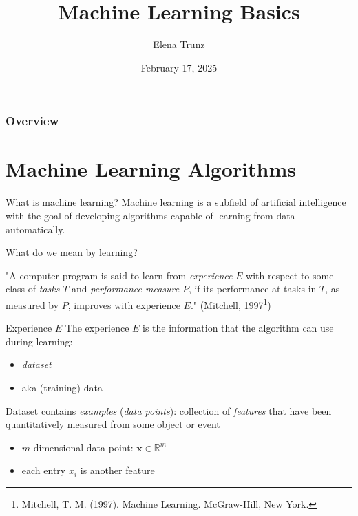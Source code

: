 \documentclass[dvipsnames]{beamer}
\title{Machine Learning Basics}
\date{February 17, 2025}%
\institute{Visual Computing Group, University of Bonn}
\author{Elena Trunz}
\begin{document}
    \maketitle

    \begin{frame}
    \frametitle{Overview} 
    \tableofcontents
    \end{frame}

   	\let\oldfootnoterule\footnoterule
	\def\footnoterule{\only<3->\oldfootnoterule}
    \section{Machine Learning Algorithms}
    \begin{frame}{What is machine learning?}
			Machine learning is a subfield of artificial intelligence with the goal of developing algorithms capable of learning
from data automatically. %

			What do we mean by learning? %

			"A computer program is said to learn from \emph{experience} $E$ with respect to some
class of \emph{tasks} $T$ and \emph{performance measure} $P$, if its performance at tasks in $T$, as
measured by $P$, improves with experience $E$." (Mitchell, 1997\footnote<3->{ Mitchell, T. M. (1997). Machine Learning. McGraw-Hill, New York.})

    \end{frame}
		
		\begin{frame}{Experience $E$}
		The experience $E$ is the information that the algorithm can use during learning:
		\begin{itemize}
			\item \emph{dataset} 
			\item aka (training) data
		\end{itemize} %

		Dataset contains \emph{examples} (\emph{data points}): collection of \emph{features} that have been quantitatively measured from some object or event
		\begin{itemize}
			\item $m$-dimensional data point: $\mathbf{x} \in \mathbb{R}^m$
			\item each entry $x_i$ is another feature
		\end{itemize}
    \end{frame}
		
\end{document}
